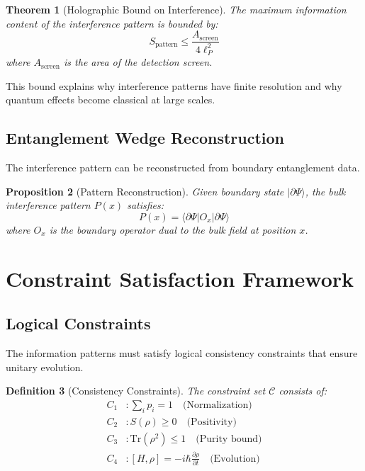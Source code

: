 \documentclass[12pt,a4paper]{article}
\newtheorem{theorem}{Theorem}[section]
\newtheorem{proposition}[theorem]{Proposition}
\newtheorem{definition}[theorem]{Definition}
\begin{document}
\begin{theorem}[Holographic Bound on Interference]
The maximum information content of the interference pattern is bounded by:
\begin{equation}
S_{\text{pattern}} \leq \frac{A_{\text{screen}}}{4\ell_P^2}
\end{equation}
where $A_{\text{screen}}$ is the area of the detection screen.
\end{theorem}

This bound explains why interference patterns have finite resolution and why quantum effects become classical at large scales.

\subsection{Entanglement Wedge Reconstruction}

The interference pattern can be reconstructed from boundary entanglement data.

\begin{proposition}[Pattern Reconstruction]
Given boundary state $|\partial\Psi\rangle$, the bulk interference pattern $P(x)$ satisfies:
\begin{equation}
P(x) = \langle\partial\Psi|O_x|\partial\Psi\rangle
\end{equation}
where $O_x$ is the boundary operator dual to the bulk field at position $x$.
\end{proposition}

\section{Constraint Satisfaction Framework}

\subsection{Logical Constraints}

The information patterns must satisfy logical consistency constraints that ensure unitary evolution.

\begin{definition}[Consistency Constraints]
The constraint set $\mathcal{C}$ consists of:
\begin{align}
C_1 &: \sum_i p_i = 1 \quad \text{(Normalization)} \\
C_2 &: S(\rho) \geq 0 \quad \text{(Positivity)} \\
C_3 &: \text{Tr}(\rho^2) \leq 1 \quad \text{(Purity bound)} \\
C_4 &: [H, \rho] = -i\hbar\frac{\partial\rho}{\partial t} \quad \text{(Evolution)}
\end{align}
\end{definition}
\end{document}
